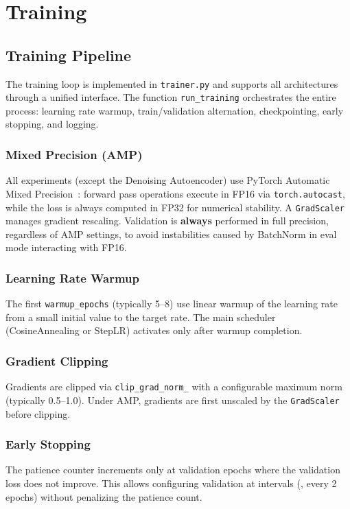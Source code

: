 \section{Training}
\label{sec:training}

\subsection{Training Pipeline}

The training loop is implemented in \texttt{trainer.py} and supports all architectures through a unified interface. The function \texttt{run\_training} orchestrates the entire process: learning rate warmup, train/validation alternation, checkpointing, early stopping, and logging.

\subsubsection{Mixed Precision (AMP)}
All experiments (except the Denoising Autoencoder) use PyTorch Automatic Mixed Precision~\cite{amp}: forward pass operations execute in FP16 via \texttt{torch.autocast}, while the loss is always computed in FP32 for numerical stability. A \texttt{GradScaler} manages gradient rescaling. Validation is \textbf{always} performed in full precision, regardless of AMP settings, to avoid instabilities caused by BatchNorm in eval mode interacting with FP16.

\subsubsection{Learning Rate Warmup}
The first \texttt{warmup\_epochs} (typically 5--8) use linear warmup of the learning rate from a small initial value to the target rate. The main scheduler (CosineAnnealing or StepLR) activates only after warmup completion.

\subsubsection{Gradient Clipping}
Gradients are clipped via \texttt{clip\_grad\_norm\_} with a configurable maximum norm (typically 0.5--1.0). Under AMP, gradients are first unscaled by the \texttt{GradScaler} before clipping.

\subsubsection{Early Stopping}
The patience counter increments only at validation epochs where the validation loss does not improve. This allows configuring validation at intervals (\eg, every 2 epochs) without penalizing the patience count.

